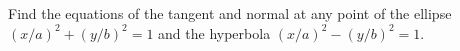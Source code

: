 Find the equations of the tangent and normal at any point of the
ellipse $(x/a)^{2} + (y/b)^{2} = 1$ and the hyperbola $(x/a)^{2} - (y/b)^{2} = 1$.


